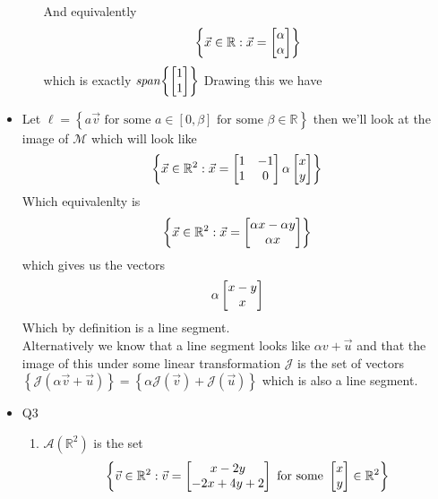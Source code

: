 \documentclass[11pt]{book}
\begin{document}
\begin{itemize}
\begin{enumerate}
\[        \]
        And equivalently 
        \[
        \left\{ \vec{x} \in \mathbb{R} :\vec{x} = \begin{bmatrix} \alpha  \\ \alpha  \end{bmatrix} \right\} 
        \]
        which is exactly $\mathit{span} {\left\{ \begin{bmatrix} 1 \\ 1 \end{bmatrix} \right\} } $ 
        Drawing this we have
        \begin{center}
        \end{center}
    \end{enumerate}
\item Let $\ell = \left\{ a \vec{v} \text{ for some  } a \in \left[ 0, \beta  \right] \text{ for some  } \beta \in \mathbb{R}   \right\} $ then we'll look at the image of $\mathcal{M} $ which will look like 
    \[
    \left\{ \vec{x} \in \mathbb{R}^2 : \vec{x} = \begin{bmatrix} 1 & -1 \\ 1 & 0 \end{bmatrix} \alpha \begin{bmatrix} x \\ y \end{bmatrix} \right\} 
    \]
    Which equivalenlty is 
    \[
        \left\{ \vec{x} \in \mathbb{R}^2 :\vec{x} = \begin{bmatrix} \alpha x - \alpha y  \\ \alpha x  \end{bmatrix} \right\} 
    \]
    which gives us the vectors
    \[
    \alpha \begin{bmatrix} x - y \\ x \end{bmatrix}
    \]
    Which by definition is a line segment.\\
    Alternatively we know that a line segment looks like $\alpha v + \vec{u} $ and that the image of this under some linear transformation $\mathcal{J} $ is the set of vectors $\left\{ \mathcal{J}\left(\alpha \vec{v}  + \vec{u} \right)  \right\}= \left\{ \alpha \mathcal{J}\left(\vec{v}\right)  + \mathcal{J}\left(\vec{u} \right)   \right\} $ which is also a line segment.
    \item Q3
    \begin{enumerate}
        \item $\mathcal{A}\left(\mathbb{R}^2 \right) $ is the set
            \begin{gather*}
                \left\{ \vec{v} \in \mathbb{R}^2 :\vec{v} = \mat{ x - 2y \\ -2x + 4y + 2 } \text{ for some  } \mat{ x \\ y } \in \mathbb{R}^2  \right\} 

\end{gather*}
\end{enumerate}
\end{itemize}
\end{document}

